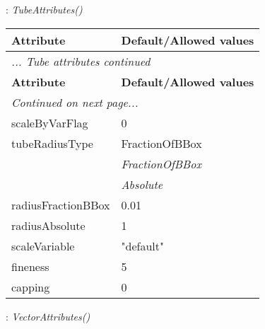 \documentclass[10pt,a4paper]{report}
\begin{document}
\newpage

{}
: {\it TubeAttributes() }\\[-3mm]

\begin{longtable}{ll}
{\bf Attribute} & {\bf Default/Allowed values} \\
\hline \hline
\endfirsthead
\multicolumn{2}{l}{{\it ... Tube attributes continued}} \\
{\bf Attribute} & {\bf Default/Allowed values} \\
\hline \hline
\endhead
\hline
\multicolumn{2}{l}{{\it Continued on next page...}} \\
\endfoot
\hline
\endlastfoot

scaleByVarFlag  &  0 \\
tubeRadiusType  &  FractionOfBBox   \\
 & {\it  FractionOfBBox} \\
 & {\it  Absolute} \\
radiusFractionBBox  &  0.01 \\
radiusAbsolute  &  1 \\
scaleVariable  &  "default" \\
fineness  &  5 \\
capping  &  0 \\
\end{longtable}

\newpage

{}
: {\it VectorAttributes() }\\[-3mm]
\end{document}
